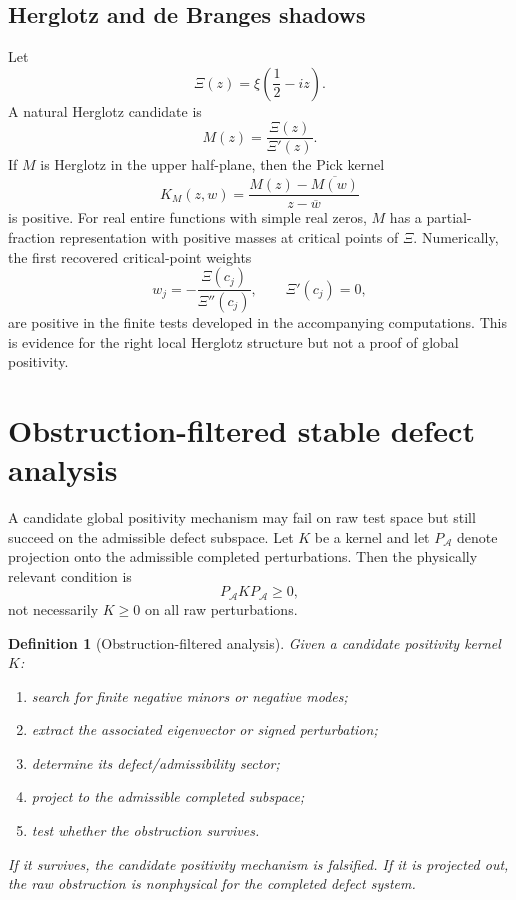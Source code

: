 \documentclass[11pt]{article}
\newtheorem{definition}[theorem]{Definition}
\newcommand{\A}{\mathcal A}
\begin{document}
\subsection{Herglotz and de Branges shadows}

Let
\[
        \Xi(z)=\xi\left(\frac12-iz\right).
\]
A natural Herglotz candidate is
\[
\boxed{
        M(z)=\frac{\Xi(z)}{\Xi'(z)}.
}
\]
If $M$ is Herglotz in the upper half-plane, then the Pick kernel
\[
\boxed{
        K_M(z,w)=\frac{M(z)-\overline{M(w)}}{z-\overline w}
}
\]
is positive. For real entire functions with simple real zeros, $M$ has a partial-fraction representation with positive masses at critical points of $\Xi$. Numerically, the first recovered critical-point weights
\[
        w_j=-\frac{\Xi(c_j)}{\Xi''(c_j)},\qquad \Xi'(c_j)=0,
\]
are positive in the finite tests developed in the accompanying computations. This is evidence for the right local Herglotz structure but not a proof of global positivity.

\section{Obstruction-filtered stable defect analysis}

A candidate global positivity mechanism may fail on raw test space but still succeed on the admissible defect subspace. Let $K$ be a kernel and let $P_\A$ denote projection onto the admissible completed perturbations. Then the physically relevant condition is
\[
\boxed{
        P_\A K P_\A\ge0,
}
\]
not necessarily $K\ge0$ on all raw perturbations.

\begin{definition}[Obstruction-filtered analysis]
Given a candidate positivity kernel $K$:
\begin{enumerate}[leftmargin=*]
    \item search for finite negative minors or negative modes;
    \item extract the associated eigenvector or signed perturbation;
    \item determine its defect/admissibility sector;
    \item project to the admissible completed subspace;
    \item test whether the obstruction survives.
\end{enumerate}
If it survives, the candidate positivity mechanism is falsified. If it is projected out, the raw obstruction is nonphysical for the completed defect system.
\end{definition}
\end{document}
